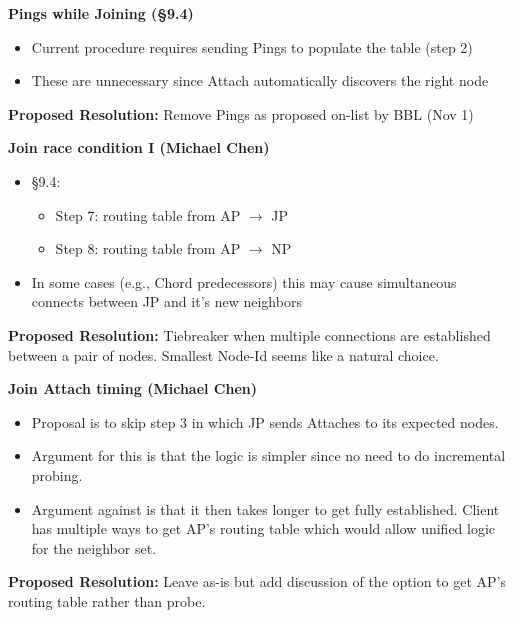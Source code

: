 \documentclass[helvetica]{seminar}
\newcommand{\heading}[1]{%
  \begin{center} 
    \large\bf 
    #1 
  \end{center} 
  \vspace{.4 in}}
\begin{document}
\begin{slide}
\heading{Pings while Joining (\S 9.4)}

\begin{itemize}
\item Current procedure requires sending Pings to populate the table (step 2)
\item These are unnecessary since Attach automatically discovers the right node
\end{itemize}

\vspace{1em}
\textbf{Proposed Resolution:} Remove Pings as proposed on-list by BBL (Nov 1)
\end{slide}



\begin{slide}
\heading{Join race condition I (Michael Chen)}

\begin{itemize}
\item \S 9.4:
\begin{itemize}
\item Step 7: routing table from AP $\rightarrow$ JP
\item Step 8: routing table from AP $\rightarrow$ NP
\end{itemize}
\item In some cases (e.g., Chord predecessors) this may cause
  simultaneous connects between JP and it's new neighbors
\end{itemize}

\vspace{1em}
\textbf{Proposed Resolution:} Tiebreaker when multiple connections are established
between a pair of nodes. Smallest Node-Id seems like a natural choice.

\end{slide}


\begin{slide}
\heading{Join Attach timing (Michael Chen)}

\begin{itemize}
\item Proposal is to skip step 3 in which JP sends Attaches to 
  its expected nodes.
\item Argument for this is that the logic is simpler since no need
  to do incremental probing.
\item Argument against is that it then takes longer to get fully 
  established. Client has multiple ways to get AP's routing table
  which would allow unified logic for the neighbor set.
\end{itemize}

\vspace{1em}
\textbf{Proposed Resolution:} Leave as-is but add discussion of the
option to get AP's routing table rather than probe.
\end{slide}
\end{document}
